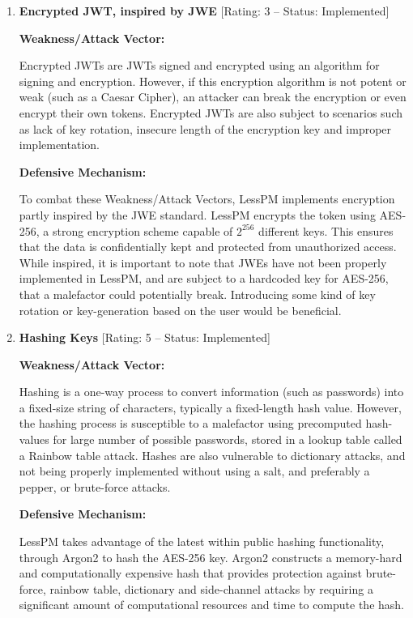 \begin{enumerate}[label=$\blacktriangleright$]
  \item \textbf{Encrypted JWT, inspired by JWE} [Rating: 3 -- Status:
  Implemented]

  \textbf{Weakness/Attack Vector:}

  Encrypted JWTs are JWTs signed and encrypted using an algorithm for
  signing and encryption.
  However, if this encryption algorithm is not potent or weak (such as a
  Caesar Cipher), an attacker can break the encryption or even encrypt their own
  tokens.
  Encrypted JWTs are also subject to scenarios such as lack of key rotation,
  insecure length of the encryption key and improper implementation.

  \textbf{Defensive Mechanism:}

  To combat these Weakness/Attack Vectors, LessPM implements encryption partly
  inspired by the JWE standard.
  LessPM encrypts the token using AES-256, a strong encryption scheme capable
  of $2^{256}$ different keys.
  This ensures that the data is confidentially kept and protected from
  unauthorized access.
  While inspired, it is important to note that JWEs have not been properly
  implemented in LessPM, and are subject to a hardcoded key for AES-256, that
  a malefactor could potentially break.
  Introducing some kind of key rotation or key-generation based on the user
  would be beneficial.

  \item \textbf{Hashing Keys} [Rating: 5 -- Status: Implemented]

  \textbf{Weakness/Attack Vector:}

  Hashing is a one-way process to convert information (such as passwords)
  into a fixed-size string of characters, typically a fixed-length hash value.
  However, the hashing process is susceptible to a malefactor using
  precomputed hash-values for large number of possible passwords, stored in a
  lookup table called a Rainbow table attack.
  Hashes are also vulnerable to dictionary attacks, and not being properly
  implemented without using a salt, and preferably a pepper, or brute-force
  attacks.

  \textbf{Defensive Mechanism:}

  LessPM takes advantage of the latest within public hashing functionality,
  through Argon2 to hash the AES-256 key.
  Argon2 constructs a memory-hard and computationally expensive hash that
  provides protection against brute-force, rainbow table, dictionary and
  side-channel attacks by requiring a significant amount of computational
  resources and time to compute the hash.


\end{enumerate}
